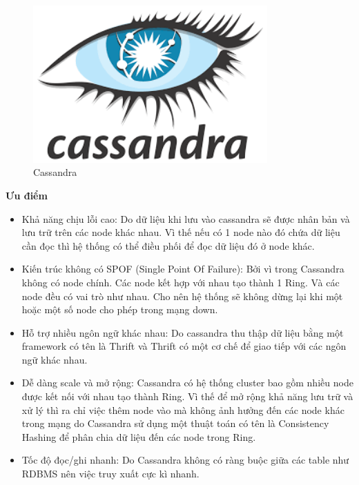             \begin{figure}[H]   			
            	\includegraphics[width=0.8\textwidth]{Images/cassandra.png}
            	\centering
            	\linebreak
            	\caption{Cassandra}
            \end{figure}
            
            \textbf{Ưu điểm}
            
            \begin{itemize}
                \item Khả năng chịu lỗi cao: Do dữ liệu khi lưu vào cassandra sẽ được nhân bản và lưu trữ trên các node khác nhau. Vì thế nếu có 1 node nào đó chứa dữ liệu cần đọc thì hệ thống có thể điều phối để đọc dữ liệu đó ở node khác.
                \item Kiến trúc không có SPOF (Single Point Of Failure): Bởi vì trong Cassandra không có node chính. Các node kết hợp với nhau tạo thành 1 Ring. Và các node đều có vai trò như nhau. Cho nên hệ thống sẽ không dừng lại khi một hoặc một số node cho phép trong mạng down.
                \item Hỗ trợ nhiều ngôn ngữ khác nhau: Do cassandra thu thập dữ liệu bằng một framework có tên là Thrift và Thrift có một cơ chế để giao tiếp với các ngôn ngữ khác nhau.
                \item Dễ dàng scale và mở rộng: Cassandra có hệ thống cluster bao gồm nhiều node được kết nối với nhau tạo thành Ring. Vì thế để mở rộng khả năng lưu trữ và xử lý thì ra chỉ việc thêm node vào mà không ảnh hưởng đến các node khác trong mạng do Cassandra sử dụng một thuật toán có tên là Consistency Hashing để phân chia dữ liệu đến các node trong Ring.
                \item Tốc độ đọc/ghi nhanh: Do Cassandra không có ràng buộc giữa các table như RDBMS nên việc truy xuất cực kì nhanh.
            \end{itemize}
            
